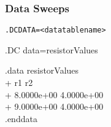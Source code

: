 \subsubsection{Data Sweeps}
 

\begin{Command}
\format
\begin{alltt}
.DC DATA=<data table name> 
\end{alltt}

\examples
.DC data=resistorValues

.data resistorValues \\
+ r1   r2 \\
+ 8.0000e+00  4.0000e+00 \\
+ 9.0000e+00  4.0000e+00 \\
.enddata

\end{Command}

